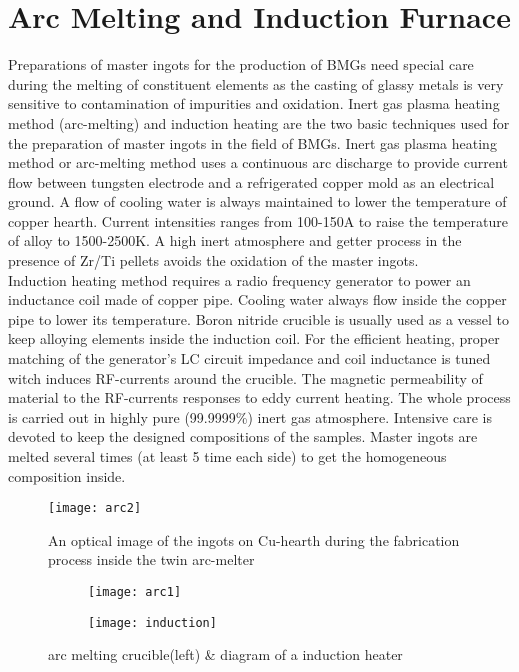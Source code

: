 \section{Arc Melting and Induction Furnace} 
Preparations of master ingots for the production of BMGs need special care during the melting of constituent elements as the casting of glassy metals is very sensitive to contamination of impurities and oxidation. Inert gas plasma heating method (arc-melting) and induction heating are the two basic techniques used for the preparation of master ingots in the field of BMGs.
Inert gas plasma heating method or arc-melting method uses a continuous arc discharge to provide current flow between tungsten electrode and a refrigerated copper mold as an electrical ground. A flow of cooling water is always maintained to lower the temperature of copper hearth. Current intensities ranges from 100-150A to raise the temperature of alloy to 1500-2500K. A high inert atmosphere and getter process in the presence of Zr/Ti pellets avoids the oxidation of the master ingots. 
\\Induction heating method requires a radio frequency generator to power an inductance coil made of copper pipe. Cooling water always flow inside the copper pipe to lower its temperature. Boron nitride crucible is usually used as a vessel to keep alloying elements inside the induction coil. For the efficient heating, proper matching of the generator’s LC circuit impedance and coil inductance is tuned witch induces RF-currents around the crucible. The magnetic permeability of material to the RF-currents responses to eddy current heating. The whole process is carried out in highly pure (99.9999\%) inert gas atmosphere. Intensive care is devoted to keep the designed compositions of the samples. Master ingots are melted several times (at least 5 time each side) to get the homogeneous composition inside.

\begin{figure}[h]
\texttt{[image: arc2]}
\caption{An optical image of the ingots on Cu-hearth during the fabrication process inside the twin arc-melter}
\end{figure}

\begin{figure}[h]
\begin{subfigure}{0.5\textwidth}
\texttt{[image: arc1]} 
\end{subfigure}
\begin{subfigure}{0.5\textwidth}
\texttt{[image: induction]}
\end{subfigure}
\caption{arc melting crucible(left) \& diagram of a induction heater}
\end{figure}


